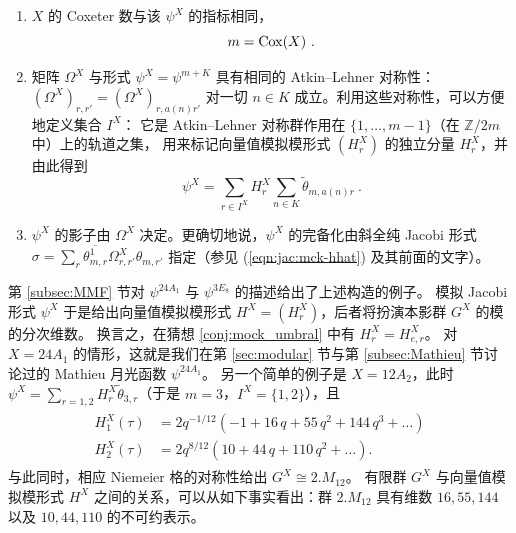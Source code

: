 \documentclass[11pt,a4paper,fontset=windows]{ctexart}
\numberwithin{equation}{section}
\newcommand{\ZZ}{\mathbb{Z}}
\def\t{\tau}
\def\O{\Omega}
\newcommand{\be}{\begin{equation}}
\newcommand{\ee}{\end{equation}}
\newcommand{\eq}[1]{(\ref{#1})}
\begin{document}

\vspace{-6,5pt}
\begin{enumerate}
\item $X$ 的 Coxeter 数与该 $\psi^X$ 的指标相同，
\vspace{-0,5pt}
\be\label{eqn:Cox_index}
m = {\rm Cox}(X)~.
\ee
\vspace{-25pt}
\item  矩阵 $\Omega^X$ 与形式 $\psi^X=\psi^{m+K}$ 具有相同的 Atkin--Lehner 对称性：
$(\Omega^X)_{r,r'}=(\Omega^X)_{r,a(n)r'}$ 对一切 $n\in K$ 成立。利用这些对称性，可以方便地定义集合 $I^X$：
它是 Atkin--Lehner 对称群作用在 $\{1,\dots,m-1\}$（在 $\ZZ/2m$ 中）上的轨道之集，
用来标记向量值模拟模形式 $(H^X_r)$ 的独立分量 $H_r^X$，并由此得到
\be\label{def:setIX}
\psi^X = \sum_{r\in I^X} H^X_r \sum_{n\in K} \tilde \theta_{m,a(n)r} ~. 
\ee
\vspace{-15pt}
\item $\psi^X$ 的影子由 $\Omega^X$ 决定。更确切地说，$\psi^X$ 的完备化由斜全纯 Jacobi 形式 $\sigma = \sum_r \overline{\theta^1_{m,r}} \O^{X}_{r,r'} \theta_{m,r'}$ 指定（参见 \eq{eqn:jac:mck-hhat} 及其前面的文字）。
\end{enumerate}
\vspace{-6,5pt}

第 \ref{subsec:MMF} 节对 $\psi^{24A_1}$ 与 $\psi^{3E_8}$ 的描述给出了上述构造的例子。
模拟 Jacobi 形式 $\psi^X$ 于是给出向量值模拟模形式 $H^{X} = (H^X_r)$，后者将扮演本影群 $G^X$ 的模的分次维数。
换言之，在猜想 \ref{conj:mock_umbral} 中有 $H^X_r=H^X_{e,r}$。
对 $X=24A_1$ 的情形，这就是我们在第 \ref{sec:modular} 节与第 \ref{subsec:Mathieu} 节讨论过的 Mathieu 月光函数 $\psi^{24A_1}$。
另一个简单的例子是 $X=12A_2$，此时 $\psi^{X} =\sum_{r=1,2} H^X_r\tilde \theta_{3,r}$（于是 $m=3$，$I^X=\{1,2\}$），且
\begin{gather}\begin{split}
H^X_1(\t)& =   2 q^{-1/12} (-1 + 16 \,q+ 55 \,q^2+ 144  \,q^3+\dots)\\ 
H^X_2(\t)& =  2 q^{8/12} (10 + 44 \,q+ 110 \,q^2+\dots) . 
\end{split}
\end{gather}
与此同时，相应 Niemeier 格的对称性给出 $G^X \cong 2.M_{12}$。
有限群 $G^X$ 与向量值模拟模形式 $H^X$ 之间的关系，可以从如下事实看出：群 $2.M_{12}$ 具有维数 $16,55, 144$ 以及 $10,44,110$ 的不可约表示。
\end{document}
